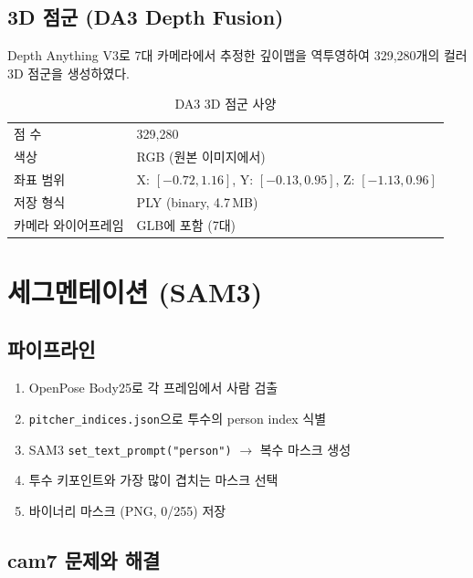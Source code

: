 \documentclass[11pt, a4paper]{report}
\begin{document}
\section{3D 점군 (DA3 Depth Fusion)}

Depth Anything V3로 7대 카메라에서 추정한 깊이맵을 역투영하여
329,280개의 컬러 3D 점군을 생성하였다.

\begin{table}[H]
\centering
\caption{DA3 3D 점군 사양}
\renewcommand{\arraystretch}{1.3}
\begin{tabular}{ll}
\toprule
점 수 & 329,280 \\
색상 & RGB (원본 이미지에서) \\
좌표 범위 & X: $[-0.72, 1.16]$, Y: $[-0.13, 0.95]$, Z: $[-1.13, 0.96]$ \\
저장 형식 & PLY (binary, 4.7\,MB) \\
카메라 와이어프레임 & GLB에 포함 (7대) \\
\bottomrule
\end{tabular}
\end{table}


\chapter{세그멘테이션 (SAM3)}

\section{파이프라인}

\begin{cvbox}[title={SAM3 세그멘테이션 파이프라인}]
\begin{enumerate}[nosep]
  \item OpenPose Body25로 각 프레임에서 사람 검출
  \item \texttt{pitcher\_indices.json}으로 투수의 person index 식별
  \item SAM3 \texttt{set\_text\_prompt("person")} $\rightarrow$ 복수 마스크 생성
  \item 투수 키포인트와 가장 많이 겹치는 마스크 선택
  \item 바이너리 마스크 (PNG, 0/255) 저장
\end{enumerate}
\end{cvbox}


\section{cam7 문제와 해결}
\end{document}
